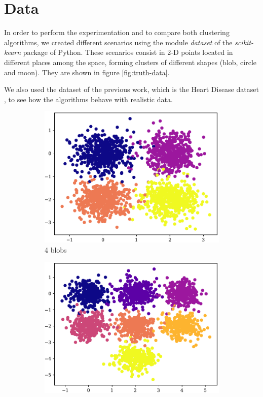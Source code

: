 \section{Data}
\label{sec:data}
In order to perform the experimentation and to compare both clustering algorithms, we created different scenarios using the module \textit{dataset} of the \textit{scikit-kearn} \cite{scikit-learn} package of Python. These scenarios consist in 2-D points located in different places among the space, forming clusters of different shapes (blob, circle and moon). They are shown in figure \ref{fig:truth-data}. 

We also used the dataset of the previous work, which is the Heart Disease dataset \cite{heart}, to see how the algorithms behave with realistic data.

\begin{figure}[hbtp]
    \begin{subfigure}[b]{0.45\columnwidth}
        \includegraphics[width=\columnwidth]{../plots/truth_4-4.pdf}
        \caption{4 blobs}
        \label{subfig:4-4-truth}
    \end{subfigure}
    \hspace{0.04\columnwidth}
    \begin{subfigure}[b]{0.45\columnwidth}
        \includegraphics[width=\columnwidth]{../plots/truth_7-3.pdf}

\end{subfigure}
\end{figure}
